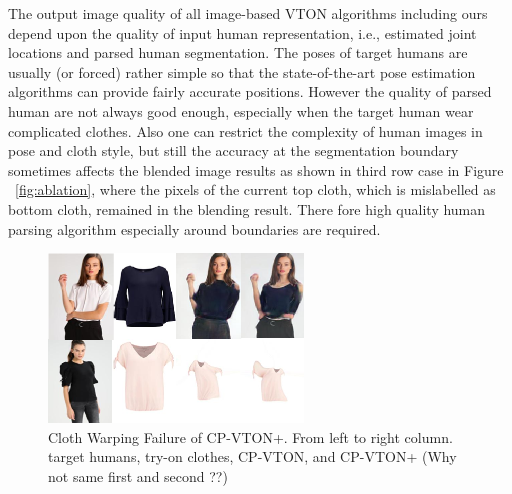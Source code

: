     
The output image quality of all image-based VTON algorithms including ours depend upon the quality of input human representation, i.e., estimated joint locations and parsed human segmentation. The poses of target humans are usually (or forced) rather simple so that the state-of-the-art pose estimation algorithms can provide fairly accurate positions. However the quality of parsed human are not always good enough, especially when the target human wear complicated clothes. Also one can restrict the complexity of human images in pose and cloth style, but still the accuracy at the segmentation boundary sometimes affects the blended image results as shown in third row case in Figure ~\ref{fig:ablation}, where the pixels of the current top cloth, which is mislabelled as bottom cloth, remained in the blending result. There fore high quality human parsing algorithm especially around boundaries are required.   

\begin{figure}
\centering
\includegraphics[height=4.5cm, scale=1]{figures/gmmfailure.png} 
\caption{Cloth Warping Failure of CP-VTON+. From left to right column. target humans, try-on clothes, CP-VTON, and CP-VTON+  (Why not same first and second ??)
}
\label{fig:gmmfailure}
\end{figure}
 